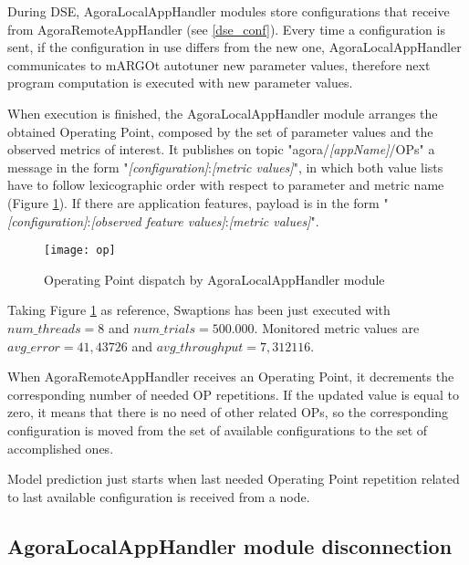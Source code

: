 During DSE, AgoraLocalAppHandler modules store configurations that receive from AgoraRemoteAppHandler (see \ref{dse_conf}). Every time a configuration is sent, if the configuration in use differs from the new one, AgoraLocalAppHandler communicates to mARGOt autotuner new parameter values, therefore next program computation is executed with new parameter values.

When execution is finished, the AgoraLocalAppHandler module arranges the obtained Operating Point, composed by the set of parameter values and the observed metrics of interest. It publishes on topic "agora/\textit{[appName]}/OPs" a message in the form "\textit{[configuration]}:\textit{[metric values]}", in which both value lists have to follow lexicographic order with respect to parameter and metric name (Figure \ref{fig:op}). If there are application features, payload is in the form "\textit{[configuration]}:\textit{[ob\-served feature values]}:\textit{[metric values]}".

\begin{figure}[htb]

    \centering
    \texttt{[image: op]}
    \caption{Operating Point dispatch by AgoraLocalAppHandler module}
    \label{fig:op}
    
\end{figure}

Taking Figure \ref{fig:op} as reference, Swaptions has been just executed with\linebreak $num\_threads = 8$ and $num\_trials = 500.000$. Monitored metric values are $avg\_error = 41,43726$ and $avg\_throughput = 7,312116$.

When AgoraRemoteAppHandler receives an Operating Point, it decrements the corresponding number of needed OP repetitions. If the updated value is equal to zero, it means that there is no need of other related OPs, so the corresponding configuration is moved from the set of available configurations to the set of accomplished ones.

Model prediction just starts when last needed Operating Point repetition related to last available configuration is received from a node.





\subsection{AgoraLocalAppHandler module disconnection}\label{client_disc}

